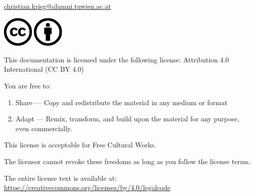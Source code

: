 \documentclass[%
	a4paper,
]
{article}
\begin{document}
\href{christian.krieg@alumni.tuwien.ac.at}{christian.krieg@alumni.tuwien.ac.at}

\vfill

\includegraphics[height=1.5cm]{fig/cc-large.png}
\includegraphics[height=1.5cm]{fig/by-large.png}


This documentation is licensed under the following license:
Attribution 4.0 International (CC BY 4.0)

\vspace{3em}

You are free to:

\begin{enumerate}
    \item Share --- Copy and redistribute the material in any medium or format
    \item Adapt --- Remix, transform, and build upon the material for any purpose,
			even commercially.
\end{enumerate}

This license is acceptable for Free Cultural Works.

The licensor cannot revoke these freedoms as long as you follow the license terms.

The entire license text is available at:
\href{https://creativecommons.org/licenses/by/4.0/legalcode}
	{https://creativecommons.org/licenses/by/4.0/legalcode}


\pagebreak
%
%


\tableofcontents
\clearpage
\printnoidxglossaries






\printbibliography
\listoffigures
\end{document}
